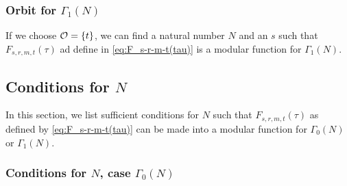 \documentclass{article}
\begin{document}
\subsubsection{Orbit for $\Gamma_1(N)$}

If we choose $\mathcal{O}_{} = \left\{t\right\}$, we can find a natural number
$N$ and an  $s$ such that
$F_{s,r,m,t}(\tau)$ ad define in \eqref{eq:F_s-r-m-t(tau)} is a
modular function for $\Gamma_1(N)$.



\subsection{Conditions for $N$}

In this section, we list sufficient conditions for $N$ such that
$F_{s,r,m,t}(\tau)$ as defined by \eqref{eq:F_s-r-m-t(tau)} can be
made into a modular function for $\Gamma_0(N)$ or $\Gamma_1(N)$.

\subsubsection{Conditions for $N$, case $\Gamma_0(N)$}
\end{document}
